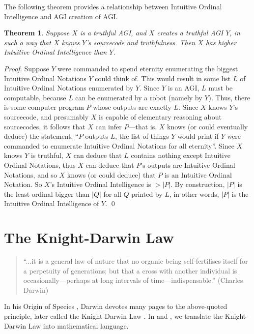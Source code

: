 \documentclass[runningheads]{llncs}
\newtheorem{mytheorem}{Theorem}
\begin{document}
The following theorem provides a relationship between Intuitive Ordinal Intelligence
and AGI creation of AGI.

\begin{mytheorem}
\label{maintheorem}
    Suppose $X$ is a truthful AGI, and $X$ creates a truthful AGI $Y$,
    in such a way that $X$ knows $Y$'s sourcecode and truthfulness. Then
    $X$ has higher Intuitive Ordinal Intelligence than $Y$.
\end{mytheorem}

\begin{proof}
    Suppose $Y$ were commanded to
    spend eternity enumerating the biggest Intuitive Ordinal Notations $Y$ could
    think of. This would result in some list $L$ of Intuitive Ordinal Notations
    enumerated by $Y$. Since $Y$ is an AGI, $L$ must be computable, because $L$ can
    be enumerated by a robot (namely by $Y$). Thus, there is some computer program
    $P$ whose outputs are exactly $L$. Since $X$ knows $Y$'s sourcecode,
    and presumably $X$ is capable of elementary reasoning about sourcecodes,
    it follows that $X$ can infer $P$---that is,
    $X$ knows (or could eventually deduce) the statement: ``$P$ outputs
    $L$, the list of things $Y$ would print if $Y$ were commanded to enumerate
    Intuitive Ordinal Notations for all eternity''. Since $X$ knows $Y$ is truthful,
    $X$ can deduce that $L$ contains nothing except Intuitive Ordinal Notations,
    thus $X$ can deduce that $P$'s outputs are Intuitive Ordinal Notations,
    and so $X$ knows (or could deduce) that $P$ is an Intuitive Ordinal Notation.
    So $X$'s Intuitive Ordinal Intelligence is $>|P|$. By construction, $|P|$ is
    the least ordinal bigger than $|Q|$ for all $Q$ printed by $L$, in other words,
    $|P|$ is the Intuitive Ordinal Intelligence of $Y$.
    \qed
\end{proof}

\section{The Knight-Darwin Law}
\label{knightdarwinagisection}

\begin{quote}
``...it is a general law of nature that no organic being self-fertilises itself
for a perpetuity of generations; but that a cross with another individual
is occasionally---perhaps at long intervals of time---indispensable.''
(Charles Darwin)
\end{quote}

In his Origin of Species \cite{originofspecies}, Darwin devotes many
pages to the above-quoted principle, later called the
Knight-Darwin Law \cite{darwin1898knight}. In \cite{alexander2013} and
\cite{alexander2015alternative}, we translate
the Knight-Darwin Law into mathematical language.
\end{document}
